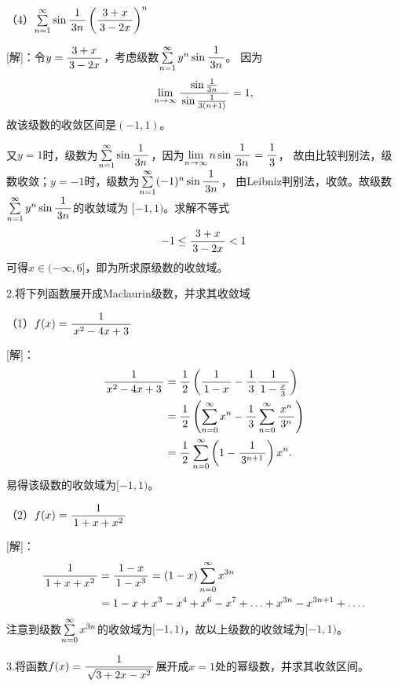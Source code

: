 （4）$\sumn\sin\df 1 {3n}\left(\df{3+x}{3-2x}\right)^n$

[解]：令$y=\df{3+x}{3-2x}$，考虑级数$\sumn y^n\sin\df1{3n}$。
因为
$$\limn\df{\sin\frac1{3n}}{\sin\frac1{3(n+1)}}=1,$$
故该级数的收敛区间是$(-1,1)$。

又$y=1$时，级数为$\sumn\sin\df1{3n}$，因为$\limn n\sin\df1{3n}=\df13$，
故由比较判别法，级数收敛；$y=-1$时，级数为$\sumn(-1)^n\sin\df1{3n}$，
由Leibniz判别法，收敛。故级数$\sumn y^n\sin\df1{3n}$的收敛域为
$[-1,1)$。求解不等式
$$-1\leq\df{3+x}{3-2x}<1$$
可得$x\in(-\infty,6]$，即为所求原级数的收敛域。\fin

\bs

2.将下列函数展开成Maclaurin级数，并求其收敛域

% 

（1）$f(x)=\df1{x^2-4x+3}$

[解]：
\begin{align*}
	\df1{x^2-4x+3}&=\df12\left(\df1{1-x}-\df13\df1{1-\frac x3}\right)\\
	&=\df12\left(\sumn[0]x^n-\df13\sumn[0]\df{x^n}{3^n}\right)\\
	&=\df12\sumn[0]\left(1-\df1{3^{n+1}}\right)x^n.
\end{align*}
易得该级数的收敛域为$[-1,1)$。

（2）$f(x)=\df 1{1+x+x^2}$

[解]：
\begin{align*}
	\df 1{1+x+x^2}
	&=\df{1-x}{1-x^3}=(1-x)\sumn[0]x^{3n}\\
	&=1-x+x^3-x^4+x^6-x^7+\ldots+x^{3n}-x^{3n+1}+\ldots.
\end{align*}
注意到级数$\sumn[0]x^{3n}$的收敛域为$[-1,1)$，故以上级数的收敛域为$[-1,1)$。\fin

\bs

3.将函数$f(x)=\df1{\sqrt{3+2x-x^2}}$展开成$x=1$处的幂级数，并求其收敛区间。

